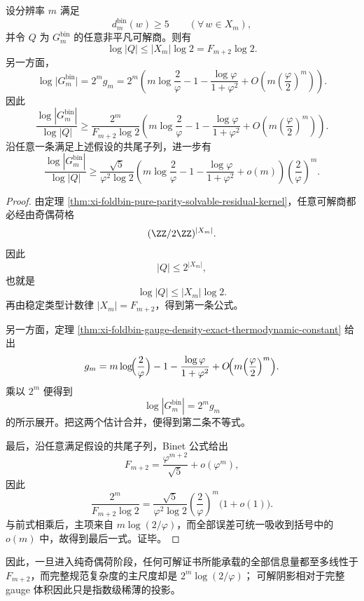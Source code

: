 \begin{theorem}[任意可解阴影相对于规范复杂度的指数稀薄律]\label{thm:xi-foldbin-solvable-shadow-exponential-thinning}
设分辨率 \(m\) 满足
\[
d_m^{\mathrm{bin}}(w)\ge 5
\qquad (\forall\, w\in X_m),
\]
并令 \(Q\) 为 \(G_m^{\mathrm{bin}}\) 的任意非平凡可解商。则有
\[
\log |Q|
\le
|X_m|\log 2
=
F_{m+2}\log 2.
\]
另一方面，
\[
\log\bigl|G_m^{\mathrm{bin}}\bigr|
=
2^m g_m
=
2^m
\left(
m\log\!\frac{2}{\varphi}
-1-\frac{\log\varphi}{1+\varphi^2}
+O\!\left(m\left(\frac{\varphi}{2}\right)^m\right)
\right).
\]
因此
\[
\frac{\log|G_m^{\mathrm{bin}}|}{\log|Q|}
\ge
\frac{2^m}{F_{m+2}\log 2}
\left(
m\log\!\frac{2}{\varphi}
-1-\frac{\log\varphi}{1+\varphi^2}
+O\!\left(m\left(\frac{\varphi}{2}\right)^m\right)
\right).
\]
沿任意一条满足上述假设的共尾子列，进一步有
\[
\frac{\log|G_m^{\mathrm{bin}}|}{\log|Q|}
\ge
\frac{\sqrt5}{\varphi^2\log 2}
\left(
m\log\!\frac{2}{\varphi}
-1-\frac{\log\varphi}{1+\varphi^2}
+o(m)
\right)
\left(\frac{2}{\varphi}\right)^m.
\]
\end{theorem}
\begin{proof}
由定理 \ref{thm:xi-foldbin-pure-parity-solvable-residual-kernel}，任意可解商都必经由奇偶荷格
\[
(\ZZ/2\ZZ)^{|X_m|}.
\]
因此
\[
|Q|\le 2^{|X_m|},
\]
也就是
\[
\log |Q|\le |X_m|\log 2.
\]
再由稳定类型计数律 \(|X_m|=F_{m+2}\)，得到第一条公式。

另一方面，定理 \ref{thm:xi-foldbin-gauge-density-exact-thermodynamic-constant} 给出
\[
g_m
=
m\log\!\Bigl(\frac{2}{\varphi}\Bigr)
-1-\frac{\log\varphi}{1+\varphi^2}
+O\!\Bigl(m\Bigl(\frac{\varphi}{2}\Bigr)^m\Bigr).
\]
乘以 \(2^m\) 便得到
\[
\log|G_m^{\mathrm{bin}}|=2^m g_m
\]
的所示展开。把这两个估计合并，便得到第二条不等式。

最后，沿任意满足假设的共尾子列，Binet 公式给出
\[
F_{m+2}
=
\frac{\varphi^{m+2}}{\sqrt5}+o(\varphi^m),
\]
因此
\[
\frac{2^m}{F_{m+2}\log 2}
=
\frac{\sqrt5}{\varphi^2\log 2}
\left(\frac{2}{\varphi}\right)^m
\bigl(1+o(1)\bigr).
\]
与前式相乘后，主项来自
\(
m\log(2/\varphi)
\)，而全部误差可统一吸收到括号中的 \(o(m)\) 中，故得到最后一式。证毕。
\end{proof}

因此，一旦进入纯奇偶荷阶段，任何可解证书所能承载的全部信息量都至多线性于
\(
F_{m+2}
\)，而完整规范复杂度的主尺度却是
\(
2^m\log(2/\varphi)
\)；
可解阴影相对于完整 gauge 体积因此只是指数级稀薄的投影。



\endinput
